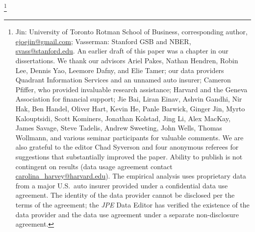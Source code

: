 \thanks{
Jin: University of Toronto Rotman School of Business, corresponding author,
\protect\href{mailto:ejoejin@gmail.com}{ejoejin@gmail.com};
Vasserman: Stanford GSB and NBER,
\protect\href{mailto:svass@stanford.edu}{svass@stanford.edu}.
An earlier draft of this paper was a chapter in our dissertations. We thank our advisors Ariel Pakes, Nathan Hendren, Robin Lee, Dennis Yao, Leemore Dafny, and Elie Tamer; our data providers Quadrant Information Services and an unnamed auto insurer; Cameron Pfiffer, who provided invaluable research assistance; Harvard and the Geneva Association for financial support;
Jie Bai,
Liran Einav, Ashvin Gandhi, Nir Hak, Ben Handel, Oliver Hart, Kevin He, Panle Barwick, Ginger Jin, Myrto Kalouptsidi, Scott Kominers, Jonathan Kolstad, Jing Li, Alex MacKay,
James Savage, Steve Tadelis, Andrew Sweeting, John Wells, Thomas Wollmann, and various seminar participants for valuable comments. We are also grateful to the editor Chad Syverson and four anonymous referees for suggestions that substantially improved the paper.
Ability to publish is not contingent on results (data usage agreement contact
 \protect\href{mailto:carolina_harvey@harvard.edu}{carolina\_harvey@harvard.edu}).
The empirical analysis uses proprietary data from a major U.S.\ auto insurer provided under a confidential data use agreement. The identity of the data provider cannot be disclosed per the terms of the agreement; the \textit{JPE} Data Editor has verified the existence of the data provider and the data use agreement under a separate non-disclosure agreement.
}